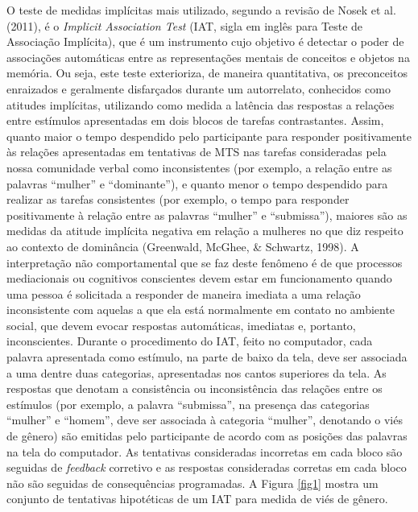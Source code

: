 O teste de medidas implícitas mais utilizado, segundo a revisão de Nosek et al. (2011), é o \textit{Implicit Association Test} (IAT, sigla em inglês para Teste de Associação Implícita), que é um instrumento cujo objetivo é detectar o poder de associações automáticas entre as representações mentais de conceitos e objetos na memória. Ou seja, este teste exterioriza, de maneira quantitativa, os preconceitos enraizados e geralmente disfarçados durante um autorrelato, conhecidos como atitudes implícitas, utilizando como medida a latência das respostas a relações entre estímulos apresentadas em dois blocos de tarefas contrastantes. Assim, quanto maior o tempo despendido pelo participante para responder positivamente às relações apresentadas em tentativas de MTS nas tarefas consideradas pela nossa comunidade verbal como inconsistentes (por exemplo, a relação entre as palavras ``mulher'' e ``dominante''), e quanto menor o tempo despendido para realizar as tarefas consistentes (por exemplo, o tempo para responder positivamente à relação entre as palavras ``mulher'' e ``submissa''), maiores são as medidas da atitude implícita negativa em relação a mulheres no que diz respeito ao contexto de dominância (Greenwald, McGhee, \& Schwartz, 1998). A interpretação não comportamental que se faz deste fenômeno é de que processos mediacionais ou cognitivos conscientes devem estar em funcionamento quando uma pessoa é solicitada a responder de maneira imediata a uma relação inconsistente com aquelas a que ela está normalmente em contato no ambiente social, que devem evocar respostas automáticas, imediatas e, portanto, inconscientes. Durante o procedimento do IAT, feito no computador, cada palavra apresentada como estímulo, na parte de baixo da tela, deve ser associada a uma dentre duas categorias, apresentadas nos cantos superiores da tela. As respostas que denotam a consistência ou inconsistência das relações entre os estímulos (por exemplo, a palavra ``submissa'', na presença das categorias ``mulher'' e ``homem'', deve ser associada à categoria ``mulher'', denotando o viés de gênero) são emitidas pelo participante de acordo com as posições das palavras na tela do computador. As tentativas consideradas incorretas em cada bloco são seguidas de \textit{feedback} corretivo e as respostas consideradas corretas em cada bloco não são seguidas de consequências programadas. A Figura \ref{fig1} mostra um conjunto de tentativas hipotéticas de um IAT para medida de viés de gênero.

